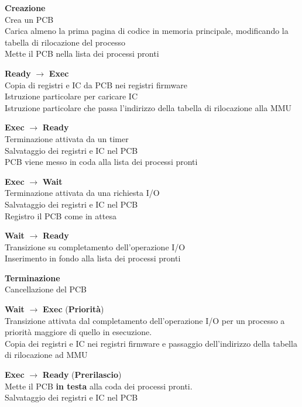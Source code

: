 \documentclass[10pt]{report}
\begin{document}
\begin{list}{}{}
	\item \textbf{Creazione}\\
	Crea un PCB\\
	Carica almeno la prima pagina di codice in memoria principale, modificando la tabella di rilocazione del processo\\
	Mette il PCB nella lista dei processi pronti
	\item \textbf{Ready} $\longrightarrow$ \textbf{Exec}\\
	Copia di registri e IC da PCB nei registri firmware\\
	Istruzione particolare per caricare IC\\
	Istruzione particolare che passa l'indirizzo della tabella di rilocazione alla MMU
	\item \textbf{Exec} $\longrightarrow$ \textbf{Ready}\\
	Terminazione attivata da un timer\\
	Salvataggio dei registri e IC nel PCB\\
	PCB viene messo in coda alla lista dei processi pronti
	\item \textbf{Exec} $\longrightarrow$ \textbf{Wait}\\
	Terminazione attivata da una richiesta I/O\\
	Salvataggio dei registri e IC nel PCB\\
	Registro il PCB come in attesa
	\item \textbf{Wait} $\longrightarrow$ \textbf{Ready}\\
	Transizione su completamento dell'operazione I/O\\
	Inserimento in fondo alla lista dei processi pronti
	\item \textbf{Terminazione}\\
	Cancellazione del PCB
	\item \textbf{Wait} $\longrightarrow$ \textbf{Exec} (\textbf{Priorità})\\
	Transizione attivata dal completamento dell'operazione I/O per un processo a priorità maggiore di quello in esecuzione.\\
	Copia dei registri e IC nei registri firmware e passaggio dell'indirizzo della tabella di rilocazione ad MMU
	\item \textbf{Exec} $\longrightarrow$ \textbf{Ready} (\textbf{Prerilascio})\\
	Mette il PCB \textbf{in testa} alla coda dei processi pronti.\\
	Salvataggio dei registri e IC nel PCB
\end{list}
\pagebreak
\end{document}
